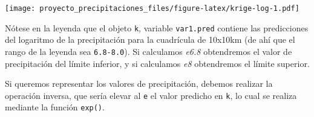 \documentclass[11pt,]{article}
\newenvironment{Shaded}{\begin{snugshade}}{\end{snugshade}}
\newcommand{\KeywordTok}[1]{\textcolor[rgb]{0.13,0.29,0.53}{\textbf{#1}}}
\newcommand{\DataTypeTok}[1]{\textcolor[rgb]{0.13,0.29,0.53}{#1}}
\newcommand{\DecValTok}[1]{\textcolor[rgb]{0.00,0.00,0.81}{#1}}
\newcommand{\StringTok}[1]{\textcolor[rgb]{0.31,0.60,0.02}{#1}}
\newcommand{\OperatorTok}[1]{\textcolor[rgb]{0.81,0.36,0.00}{\textbf{#1}}}
\newcommand{\NormalTok}[1]{#1}
\begin{document}
\begin{Shaded}
\end{Shaded}

\texttt{[image: proyecto\_precipitaciones\_files/figure-latex/krige-log-1.pdf]}

Nótese en la leyenda que el objeto \texttt{k}, variable
\texttt{var1.pred} contiene las predicciones del logaritmo de la
precipitación para la cuadrícula de 10x10km (de ahí que el rango de la
leyenda sea \texttt{6.8-8.0}). Si calculamos \emph{e6.8} obtendremos el
valor de precipitación del límite inferior, y si calculamos \emph{e8}
obtendremos el límite superior.

Si queremos representar los valores de precipitación, debemos realizar
la operación inversa, que sería elevar al \texttt{e} el valor predicho
en \texttt{k}, lo cual se realiza mediante la función \texttt{exp()}.
\end{document}
